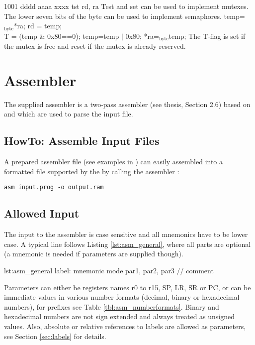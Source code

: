 	{1001 dddd aaaa xxxx}
	{tst rd, ra}
	{Test and set can be used to implement mutexes. The lower seven bits of the byte can be used to implement semaphores.}
	{temp=$_\text{byte}$*ra; rd = temp;\\T = (temp \& 0x80==0); temp=temp $|$ 0x80; *ra=$_\text{byte}$temp;}
	{The T-flag is set if the mutex is free and reset if the mutex is already reserved.}

\section{Assembler}

The supplied assembler is a two-pass assembler (see thesis, Section 2.6) based on  and  which are used to parse the input file.

\subsection{HowTo: Assemble Input Files}
A prepared assembler file  (see examples in ) can easily assembled into a formatted file  supported by the \procname by calling the assembler :
\begin{verbatim}
asm input.prog -o output.ram
\end{verbatim}

\subsection{Allowed Input}
The input to the assembler is case sensitive and all mnemonics have to be lower case. A typical line follows Listing \ref{lst:asm_general}, where all parts are optional (a mnemonic is needed if parameters are supplied though).

\begin{asm}{lst:asm_general}
label: mnemonic mode par1, par2, par3 // comment
\end{asm}

Parameters can either be registers names r0 to r15, SP, LR, SR or PC,
or can be immediate values in various number formats (decimal, binary or hexadecimal numbers),
for prefixes see Table \ref{tbl:asm_numberformats}.
Binary and hexadecimal numbers are not sign extended and always treated as unsigned values.
Also, absolute or relative references to labels are allowed as parameters, see Section \ref{sec:labels} for details.

